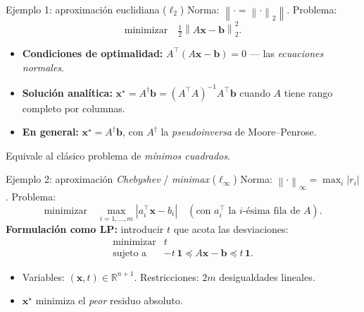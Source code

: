 \documentclass[10pt,aspectratio=169]{beamer}
\newcommand{\R}{\mathbb{R}}
\newcommand{\x}{\mathbf{x}}
\newcommand{\xb}{\mathbf{b}}
\newcommand{\0}{\mathbf{0}}
\newcommand{\1}{\mathbf{1}}
\newcommand{\norm}[1]{\left\|#1\right\|}
\begin{document}
\begin{frame}{Ejemplo 1: aproximación euclidiana ($\ell_2$)}
  Norma: $\norm{\cdot = \norm{\cdot}_2}$. Problema:
  \[
    \text{minimizar}\quad \tfrac{1}{2}\norm{A\x-\xb}_2^2.
  \]
  \begin{itemize}
    \item \textbf{Condiciones de optimalidad:} $A^\top(A\x-\xb) = 0$
      --- las \emph{ecuaciones normales}.
    \item \textbf{Solución analítica:} $\x^\star = A^\dagger \xb =
      (A^\top A)^{-1}A^\top \xb$ cuando $A$ tiene rango completo por columnas.
    \item \textbf{En general:} $\x^\star = A^\dagger \xb$, con
      $A^\dagger$ la \emph{pseudoinversa} de Moore--Penrose.
  \end{itemize}
  \begin{block}{}
    Equivale al clásico problema de \emph{mínimos cuadrados}.
  \end{block}
\end{frame}

\begin{frame}{Ejemplo 2: aproximación \emph{Chebyshev} / \emph{minimax} ($\ell_\infty$)}
  Norma: $\norm{\cdot}_\infty = \max_i |r_i|$. Problema:
  \[
    \text{minimizar}\quad \max_{i=1,\dots,m} |a_i^\top\x - b_i|
    \quad(\text{con } a_i^\top \text{ la } i\text{-ésima fila de } A).
  \]
  \textbf{Formulación como LP:} introducir $t$ que acota las desviaciones:
  \[
    \begin{array}{ll}
      \text{minimizar} & t \\
      \text{sujeto a}  & -t\,\1 \preceq A\x - \xb \preceq t\,\1.
    \end{array}
  \]
  \begin{itemize}
    \item Variables: $(\x,t)\in\R^{n+1}$. Restricciones: $2m$ desigualdades lineales.
    \item $\x^\star$ minimiza el \emph{peor} residuo absoluto.
  \end{itemize}
\end{frame}
\end{document}
